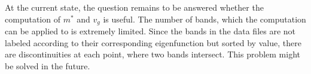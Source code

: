 At the current state, the question remains to be answered whether the computation of $m^{*}$ and $v_g$ is useful. The number of bands, which the computation can be applied to is extremely limited. Since the bands in the data files are not labeled according to their corresponding eigenfunction but sorted by value, there are discontinuities at each point, where two bands intersect. This problem might be solved in the future. 













%
%    



